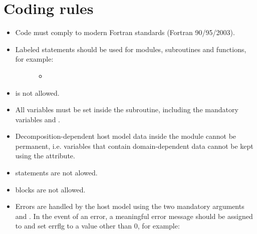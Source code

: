 \documentclass[letterpaper,10pt,english]{sphinxmanual}
\begin{document}
\section{Coding rules}
\label{\detokenize{CompliantPhysicsParams:coding-rules}}\begin{itemize}
\item {} 
Code must comply to modern Fortran standards (Fortran 90/95/2003).

\item {} \begin{description}
\item[{Labeled  statements should be used for modules, subroutines and functions, for example:}] \leavevmode\begin{itemize}
\item {} 

\end{itemize}

\end{description}

\item {} 
 is not allowed.

\item {} 
All  variables must be set inside the subroutine, including the mandatory
variables  and .

\item {} 
Decomposition-dependent host model data inside the module cannot be permanent,
i.e. variables that contain domain-dependent data cannot be kept using the  attribute.

\item {} 
 statements are not alowed.

\item {} 
 blocks are not allowed.

\item {} 
Errors are handled by the host model using the two mandatory arguments  and
. In the event of an error, a meaningful error message should be assigned to 
and set errflg to a value other than 0, for example:

\end{itemize}
\end{document}

